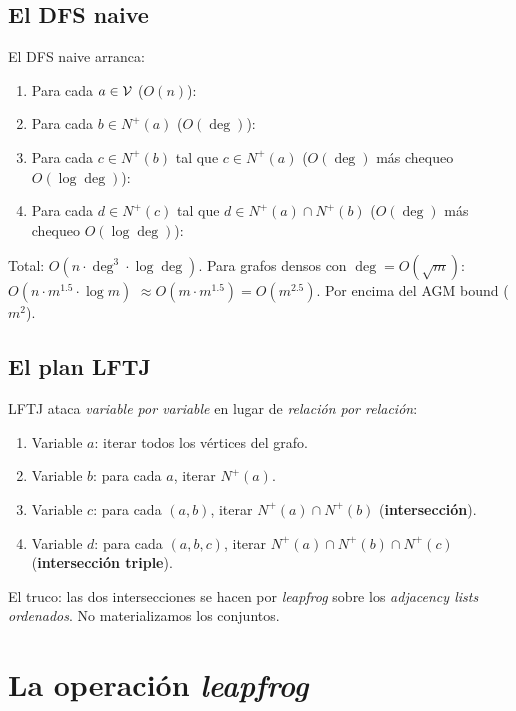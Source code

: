 \subsection{El DFS naive}

El DFS naive arranca:
\begin{enumerate}
    \item Para cada \(a \in \mathcal{V}\) (\(O(n)\)):
    \item Para cada \(b \in N^{+}(a)\) (\(O(\deg)\)):
    \item Para cada \(c \in N^{+}(b)\) tal que \(c \in N^{+}(a)\)
    (\(O(\deg)\) más chequeo \(O(\log \deg)\)):
    \item Para cada \(d \in N^{+}(c)\) tal que \(d \in N^{+}(a) \cap
    N^{+}(b)\) (\(O(\deg)\) más chequeo \(O(\log \deg)\)):
\end{enumerate}

\noindent
Total: \(O(n \cdot \deg^3 \cdot \log \deg)\). Para grafos densos con
\(\deg = O(\sqrt{m})\): \(O(n \cdot m^{1.5} \cdot \log m)\) \(\approx
O(m \cdot m^{1.5}) = O(m^{2.5})\). Por encima del AGM bound
(\(m^2\)).

\subsection{El plan LFTJ}

LFTJ ataca \emph{variable por variable} en lugar de
\emph{relación por relación}:

\begin{enumerate}
    \item Variable \(a\): iterar todos los vértices del grafo.
    \item Variable \(b\): para cada \(a\), iterar \(N^{+}(a)\).
    \item Variable \(c\): para cada \((a, b)\), iterar
    \(N^{+}(a) \cap N^{+}(b)\) (\textbf{intersección}).
    \item Variable \(d\): para cada \((a, b, c)\), iterar
    \(N^{+}(a) \cap N^{+}(b) \cap N^{+}(c)\) (\textbf{intersección triple}).
\end{enumerate}

\noindent
El truco: las dos intersecciones se hacen por \emph{leapfrog} sobre
los \emph{adjacency lists ordenados}. No materializamos los conjuntos.

\section{La operación \emph{leapfrog}}

